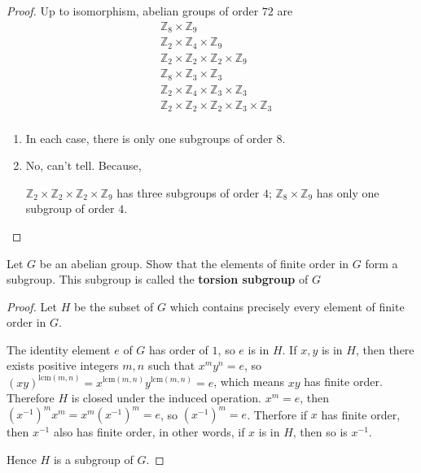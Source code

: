 \begin{proof}
    Up to isomorphism, abelian groups of order $72$ are
    \begin{align*}
         & \mathbb{Z}_{8} \times \mathbb{Z}_{9}                                                                   \\
         & \mathbb{Z}_{2} \times \mathbb{Z}_{4} \times \mathbb{Z}_{9}                                             \\
         & \mathbb{Z}_{2} \times \mathbb{Z}_{2} \times \mathbb{Z}_{2} \times \mathbb{Z}_{9}                       \\
         & \mathbb{Z}_{8} \times \mathbb{Z}_{3} \times \mathbb{Z}_{3}                                             \\
         & \mathbb{Z}_{2} \times \mathbb{Z}_{4} \times \mathbb{Z}_{3} \times \mathbb{Z}_{3}                       \\
         & \mathbb{Z}_{2} \times \mathbb{Z}_{2} \times \mathbb{Z}_{2} \times \mathbb{Z}_{3} \times \mathbb{Z}_{3} \\
    \end{align*}
    \begin{enumerate}[label={\textbf{\alph*.}}]
        \item In each case, there is only one subgroups of order $8$.
        \item No, can't tell. Because,

              $\mathbb{Z}_{2} \times \mathbb{Z}_{2} \times \mathbb{Z}_{2} \times \mathbb{Z}_{9}$ has three subgroups of order $4$; $\mathbb{Z}_{8} \times \mathbb{Z}_{9}$ has only one subgroup of order $4$.
    \end{enumerate}
\end{proof}

\begin{exercise}
    Let $G$ be an abelian group. Show that the elements of finite order in $G$ form a subgroup. This subgroup is called the \textbf{torsion subgroup} of $G$
\end{exercise}

\begin{proof}
    Let $H$ be the subset of $G$ which contains precisely every element of finite order in $G$.

    The identity element $e$ of $G$ has order of $1$, so $e$ is in $H$. If $x, y$ is in $H$, then there exists positive integers $m, n$ such that $x^{m}y^{n} = e$, so ${(xy)}^{\text{lcm}(m, n)} = x^{\text{lcm}(m,n)}y^{\text{lcm}(m,n)} = e$, which means $xy$ has finite order. Therefore $H$ is closed under the induced operation. $x^{m} = e$, then ${(x^{-1})}^{m}x^{m} = x^{m}{(x^{-1})}^{m} = e$, so ${(x^{-1})}^{m} = e$. Therfore if $x$ has finite order, then $x^{-1}$ also has finite order, in other words, if $x$ is in $H$, then so is $x^{-1}$.

    Hence $H$ is a subgroup of $G$.
\end{proof}


